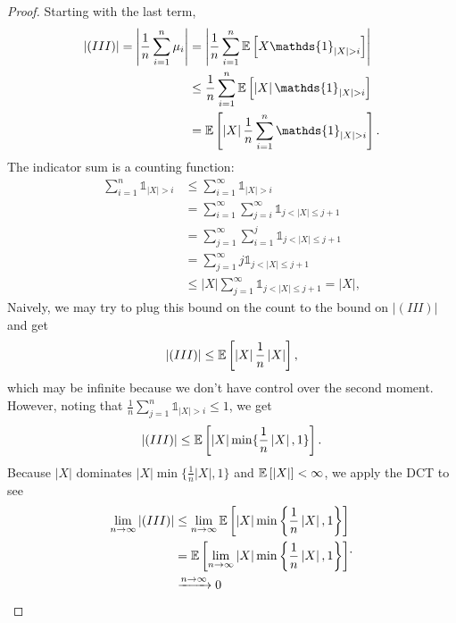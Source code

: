 \begin{proof}
	Starting with the last term,
	\begin{align*}
		\left| (III) \right| = \left| \frac{1}{n} \sum\limits_{i=1}^{n} \mu_i \right| &= \left| \frac{1}{n} \sum\limits_{i=1}^{n} \E\left[X \mathds{1}_{\left| X \right| > i}\right]  \right|\\
							 &\le \frac{1}{n} \sum\limits_{i=1}^{n} \E\left[\left| X \right| \mathds{1}_{\left| X \right| > i}\right] \\
							 &= \E\left[\left| X \right| \frac{1}{n} \sum\limits_{i=1}^{n} \mathds{1}_{\left| X \right| > i}\right]
	.\end{align*}
	The indicator sum is a counting function:
	\begin{align*}
		\sum\limits_{i=1}^{n} \mathds{1}_{\left| X \right| > i} &\le \sum\limits_{i=1}^{\infty} \mathds{1}_{\left| X \right| > i} \\
																&= \sum\limits_{i=1}^{\infty} \sum\limits_{j=i}^{\infty} \mathds{1}_{j < \left| X \right| \le j+1} \\
																&= \sum\limits_{j=1}^{\infty} \sum\limits_{i=1}^{j} \mathds{1}_{j < \left| X \right|\le j+1} \\
																&= \sum\limits_{j=1}^{\infty} j \mathds{1}_{j < \left| X \right| \le j+1}\\
																&\le \left| X \right| \sum\limits_{j=1}^{\infty} \mathds{1}_{j < \left| X \right| \le j + 1} = \left| X \right|
	,\end{align*}
	Naively, we may try to  plug this bound on the count to the bound on $\left| (III) \right|$ and get \[
		\left| (III) \right| \le \mathbb{E}\left[\left| X \right|\frac{1}{n}\left| X \right|\right] 
	,\]
	which may be infinite because we don't have control over the second moment. However, noting that $\frac{1}{n} \sum\limits_{j=1}^{n} \mathds{1}_{\left| X \right| > i} \le 1$, we get \[
		\left| (III) \right| \le \mathbb{E}\left[\left| X \right| \min \{\frac{1}{n}\left| X \right|, 1\}\right] 
	.\] Because $\left| X \right|$ dominates $\left| X \right| \min\{\frac{1}{n} \left| X \right|, 1\}$ and $\mathbb{E}\left[\left| X \right|\right] < \infty$, we apply the DCT to see
	\[
			\begin{aligned}
				\lim\limits_{n \to \infty} \left| (III) \right|
				&\le \lim\limits_{n \to \infty} \mathbb{E}\left[\left| X \right| \min \left\{\frac{1}{n} \left| X \right|, 1\right\}\right] \\
				&= \mathbb{E}\left[\lim\limits_{n \to \infty} \left| X \right| \min \left\{\frac{1}{n} \left| X \right|, 1\right\}\right] \\
				&\xrightarrow{n\to \infty} 0
			\end{aligned}
	.\] 


\end{proof}
